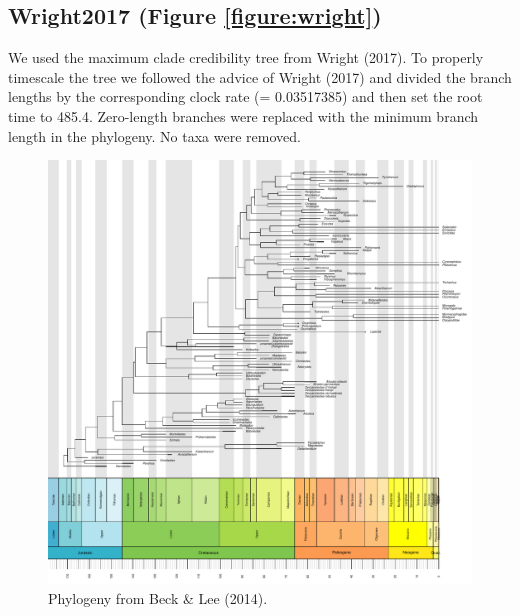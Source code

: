 \documentclass[12pt,a4paper]{article}
\begin{document}
\subsection{Wright2017 (Figure \ref{figure:wright})}
We used the maximum clade credibility tree from Wright (2017). 
To properly timescale the tree we followed the advice of Wright (2017) and divided the branch lengths by the corresponding clock rate (= 0.03517385)  and then set the root time to 485.4. 
Zero-length branches were replaced with the minimum branch length in the phylogeny.
No taxa were removed. 

\begin{figure}[!htbp]
    \centering
    \includegraphics[width=1\linewidth, height=1\textheight, keepaspectratio]{figures/fig-tree-Beck2014-appendix.pdf}
    \caption[Beck2014.]
    {Phylogeny from Beck \& Lee (2014).}
    \label{figure:beck}
  \end{figure} 
\end{document}
